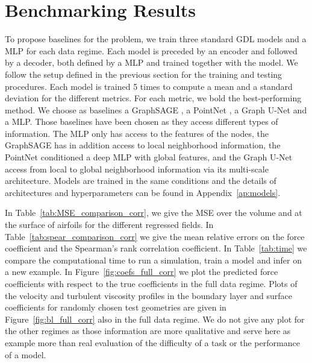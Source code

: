 \section{Benchmarking Results}\label{sec:results}
To propose baselines for the problem, we train three standard \acrshort{GDL} models and a \acrfull{MLP} for each data regime. Each model is preceded by an encoder and followed by a decoder, both defined by a \acrshort{MLP} and trained together with the model. We follow the setup defined in the previous section for the training and testing procedures. Each model is trained 5 times to compute a mean and a standard deviation for the different metrics. For each metric, we bold the best-performing method. We choose as baselines a GraphSAGE \cite{gsage}, a PointNet \cite{qi2016pointnet}, a Graph U-Net \cite{gunet} and a \acrshort{MLP}. Those baselines have been chosen as they access different types of information. The \acrshort{MLP} only has access to the features of the nodes, the GraphSAGE has in addition access to local neighborhood information, the PointNet conditioned a deep \acrshort{MLP} with global features, and the Graph U-Net access from local to global neighborhood information via its multi-scale architecture. Models are trained in the same conditions and the details of architectures and hyperparameters can be found in Appendix~\ref{ap:models}.

In Table~\ref{tab:MSE_comparison_corr}, we give the \acrshort{MSE} over the volume and at the surface of airfoils for the different regressed fields. In Table~\ref{tab:spear_comparison_corr} we give the mean relative errors on the force coefficient and the Spearman's rank correlation coefficient. In Table~\ref{tab:time} we compare the computational time to run a simulation, train a model and infer on a new example. In Figure~\ref{fig:coefs_full_corr} we plot the predicted force coefficients with respect to the true coefficients in the full data regime. Plots of the velocity and turbulent viscosity profiles in the boundary layer and surface coefficients for randomly chosen test geometries are given in Figure~\ref{fig:bl_full_corr} also in the full data regime. We do not give any plot for the other regimes as those information are more qualitative and serve here as example more than real evaluation of the difficulty of a task or the performance of a model.

